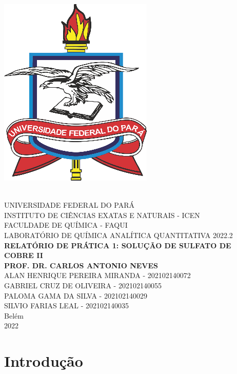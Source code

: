 \documentclass[a4paper, 11pt]{article}
\begin{document}
\thispagestyle{empty} %

\begin{center}
\parbox{3cm}{\includegraphics[scale=1]{logo_ufpa}} \\
{\vspace {1.0cm}}
{\Large \uppercase {Universidade Federal do Pará}}\\
{\Large \uppercase {Instituto de Ciências Exatas e Naturais - ICEN}}\\
\vspace{3cm}
{\Large \uppercase {Faculdade de Química - FAQUI}}\\
{\Large \uppercase {Laboratório de Química Analítica Quantitativa 2022.2} }\\
\vspace{3cm}
{\Large \textbf \uppercase {Relatório de Prática 1: Solução de Sulfato de Cobre II}}\\
{\Large \textbf \uppercase {Prof. Dr. Carlos Antonio Neves}}\\
\vspace{3cm}
{\Large \uppercase {Alan Henrique Pereira Miranda - 202102140072}}\\
{\Large \uppercase {Gabriel Cruz de Oliveira - 202102140055}}\\
{\Large \uppercase {Paloma Gama da Silva - 202102140029}}\\
{\Large \uppercase {Silvio Farias Leal - 202102140035}}\\
\vspace{0.5cm}
{\Large  {Belém \\ 2022}}
\end{center}

\newpage
\section{Introdução}\label{sec:introducao}
\end{document}
